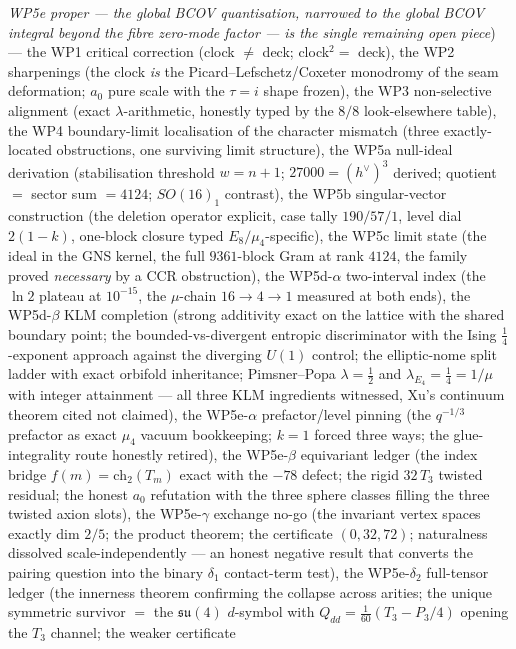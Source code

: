 \emph{WP5e proper
--- the global BCOV quantisation, narrowed to the global BCOV integral beyond the fibre
zero-mode factor ---
is the single remaining open piece}) --- the WP1 critical correction (clock $\neq$ deck; clock$^2=$ deck),
the WP2 sharpenings (the clock \emph{is} the Picard--Lefschetz/Coxeter monodromy of the seam
deformation; $a_0$ pure scale with the $\tau{=}i$ shape frozen), the WP3 non-selective alignment (exact
$\lambda$-arithmetic, honestly typed by the $8/8$ look-elsewhere table), the WP4 boundary-limit
localisation of the character mismatch (three exactly-located obstructions, one surviving limit
structure), the WP5a null-ideal derivation (stabilisation threshold $w=n{+}1$; $27000=(h^\vee)^3$
derived; quotient $=$ sector sum $=4124$; $SO(16)_1$ contrast), the WP5b singular-vector
construction (the deletion operator explicit, case tally $190/57/1$, level dial $2(1{-}k)$, one-block
closure typed $E_8/\mu_4$-specific), the WP5c limit state (the ideal in the GNS kernel, the full
$9361$-block Gram at rank $4124$, the family proved \emph{necessary} by a CCR obstruction), the
WP5d-$\alpha$ two-interval index (the $\ln2$ plateau at $10^{-15}$, the $\mu$-chain $16\to4\to1$
measured at both ends), the WP5d-$\beta$ KLM completion (strong additivity exact on the lattice
with the shared boundary point; the bounded-vs-divergent entropic discriminator with the Ising
$\tfrac14$-exponent approach against the diverging $U(1)$ control; the elliptic-nome split ladder
with exact orbifold inheritance; Pimsner--Popa $\lambda=\tfrac12$ and $\lambda_{E_4}=\tfrac14=1/\mu$
with integer attainment --- all three KLM ingredients witnessed, Xu's continuum theorem cited not
claimed), the WP5e-$\alpha$ prefactor/level pinning (the $q^{-1/3}$ prefactor as
exact $\mu_4$ vacuum bookkeeping; $k=1$ forced three ways; the glue-integrality route honestly
retired), the WP5e-$\beta$ equivariant ledger (the index bridge $f(m)=\mathrm{ch}_2(T_m)$
exact with the $-78$ defect; the rigid $32\,T_3$ twisted residual; the honest $a_0$ refutation
with the three sphere classes filling the three twisted axion slots), the WP5e-$\gamma$
exchange no-go (the invariant vertex spaces exactly dim $2/5$; the product theorem; the
certificate $(0,32,72)$; naturalness dissolved scale-independently --- an honest negative result
that converts the pairing question into the binary $\delta_1$ contact-term test), the
WP5e-$\delta_2$ full-tensor ledger (the innerness theorem confirming the collapse across arities;
the unique symmetric survivor $=$ the $\mathfrak{su}(4)$ $d$-symbol with
$Q_{dd}=\tfrac1{60}(T_3-P_3/4)$ opening the $T_3$ channel; the weaker certificate
